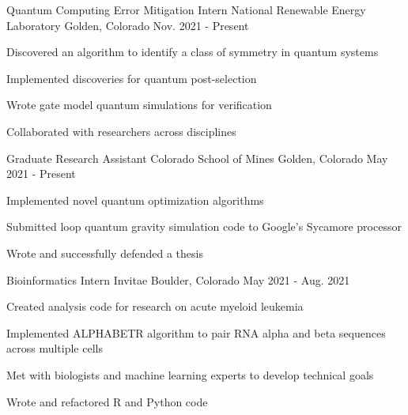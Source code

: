 

\begin{cventries}

  \cventry
    {Quantum Computing Error Mitigation Intern}
    {National Renewable Energy Laboratory}
    {Golden, Colorado}
    {Nov. 2021 - Present}
    {
      \begin{cvitems}
        \item {Discovered an algorithm to identify a class of symmetry in quantum systems}
        \item {Implemented discoveries for quantum post-selection}
        \item {Wrote gate model quantum simulations for verification}
        \item {Collaborated with researchers across disciplines}
      \end{cvitems}
    }

  \cventry
    {Graduate Research Assistant}
    {Colorado School of Mines}
    {Golden, Colorado}
    {May 2021 - Present}
    {
      \begin{cvitems}
        \item {Implemented novel quantum optimization algorithms}
        \item {Submitted loop quantum gravity simulation code to Google's Sycamore processor}
        \item {Wrote and successfully defended a thesis}
      \end{cvitems}
    }

  \cventry
    {Bioinformatics Intern}
    {Invitae}
    {Boulder, Colorado}
    {May 2021 - Aug. 2021}
    {
      \begin{cvitems}
        \item {Created analysis code for research on acute myeloid leukemia}
        \item {Implemented ALPHABETR algorithm to pair RNA alpha and beta sequences across multiple cells}
        \item {Met with biologists and machine learning experts to develop technical goals}
        \item {Wrote and refactored R and Python code}
      \end{cvitems}
    }
    

\end{cventries}
